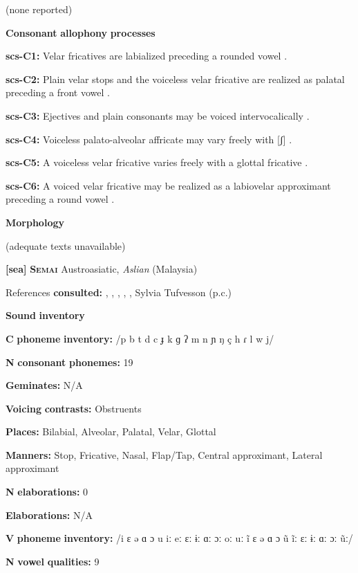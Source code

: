 (none reported)

\textbf{Consonant} \textbf{allophony} \textbf{processes}

\textbf{scs-C1:} Velar fricatives are labialized preceding a rounded vowel \citep[31]{Rice1989}.

\textbf{scs-C2:} Plain velar stops and the voiceless velar fricative are realized as palatal preceding a front vowel \citep[31]{Rice1989}.

\textbf{scs-C3:} Ejectives and plain consonants may be voiced intervocalically \citep[31]{Rice1989}.

\textbf{scs-C4:} Voiceless palato-alveolar affricate may vary freely with [ʃ] \citep[35]{Rice1989}.

\textbf{scs-C5:} A voiceless velar fricative varies freely with a glottal fricative \citep[32]{Rice1989}.

\textbf{scs-C6:} A voiced velar fricative may be realized as a labiovelar approximant preceding a round vowel \citep[32]{Rice1989}.

\textbf{Morphology}

(adequate texts unavailable)

\textbf{[sea]}   \textbf{\textsc{Semai}  }  Austroasiatic, \textit{Aslian} (Malaysia)

References \textbf{consulted:} \citet{Dentan2003}, \citet{Diffloth1976a}, \citet{Diffloth1976b}, \citet{Philips2007}, \citet{Sloan1988}, Sylvia Tufvesson (p.c.)

\textbf{Sound} \textbf{inventory}

\textbf{C} \textbf{phoneme} \textbf{inventory:} /p b t d c ɟ k ɡ ʔ m n ɲ ŋ ç h ɾ l w j/

\textbf{N} \textbf{consonant} \textbf{phonemes:} 19

\textbf{Geminates:} N/A

\textbf{Voicing} \textbf{contrasts:} Obstruents

\textbf{Places:} Bilabial, Alveolar, Palatal, Velar, Glottal

\textbf{Manners:} Stop, Fricative, Nasal, Flap/Tap, Central approximant, Lateral approximant

\textbf{N} \textbf{elaborations:} 0

\textbf{Elaborations:} N/A

\textbf{V} \textbf{phoneme} \textbf{inventory:} /i ɛ ə ɑ ɔ u iː eː ɛː ɨː ɑː ɔː oː uː ĩ ɛ ə ɑ ɔ ũ ĩː ɛː ɨː ɑː ɔː ũː/

\textbf{N} \textbf{vowel} \textbf{qualities:} 9

